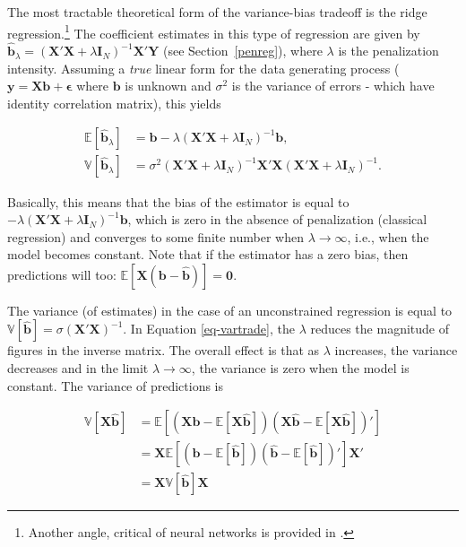 The most tractable theoretical form of the variance-bias tradeoff is the ridge regression.\footnote{Another angle, critical of neural networks is provided in \cite{geman1992neural}.} The coefficient estimates in this type of regression are given by $\hat{\mathbf{b}}_\lambda=(\mathbf{X}'\mathbf{X}+\lambda \mathbf{I}_N)^{ -1}\mathbf{X}'\mathbf{Y}$ (see Section~\ref{penreg}), where $\lambda$ is the penalization intensity. Assuming a \textit{true} linear form for the data generating process ($\textbf{y}=\textbf{Xb}+\boldsymbol{\epsilon}$ where $\textbf{b}$ is unknown and $\sigma^2$ is the variance of errors - which have identity correlation matrix), this yields

\begin{equation}
\label{eq-vartrade}
\begin{aligned}  
\mathbb{E}[\hat{\textbf{b}}_\lambda]&=\textbf{b}-\lambda(\textbf{X}'\textbf{X}+\lambda \textbf{I}_N)^{-1} \textbf{b}, \\
\mathbb{V}[\hat{\textbf{b}}_\lambda]&=\sigma^2(\textbf{X}'\textbf{X}+\lambda \textbf{I}_N)^{-1}\textbf{X}'\textbf{X}   (\textbf{X}'\textbf{X}+\lambda \textbf{I}_N)^{-1}.
\end{aligned}
\end{equation}

Basically, this means that the bias of the estimator is equal to $-\lambda(\textbf{X}'\textbf{X}+\lambda \textbf{I}_N)^{ -1} \textbf{b}$, which is zero in the absence of penalization (classical regression) and converges to some finite number when $\lambda \rightarrow \infty$, i.e., when the model becomes constant. Note that if the estimator has a zero bias, then predictions will too: $\mathbb{E}[\textbf{X}(\textbf{b} -\hat{\textbf{b}})]=\textbf{0}$.

The variance (of estimates) in the case of an unconstrained regression is equal to $\mathbb{V}[\hat{\textbf{b}}]=\sigma (\textbf{X}'\textbf{X})^{ -1}$. In Equation \ref{eq-vartrade}, the $\lambda$ reduces the magnitude of figures in the inverse matrix. The overall effect is that as $\lambda$ increases, the variance decreases and in the limit $\lambda \rightarrow \infty$, the variance is zero when the model is constant. The variance of predictions is

\begin{equation}
\begin{aligned}
\mathbb{V}[\textbf{X}\hat{\textbf{b}}]&=\mathbb{E}[(\textbf{X}\hat{\textbf{b}}-\mathbb{E}[\textbf{X}\hat{\textbf{b}}])(\textbf{X}\hat{\textbf{b}}-\mathbb{E}[\textbf{X}\hat{\textbf{b}}])'] \\
&= \textbf{X}\mathbb{E}[(\hat{\textbf{b}}-\mathbb{E}[\hat{\textbf{b}}])(\hat{\textbf{b}}-\mathbb{E}[\hat{\textbf{b}}])']\textbf{X}' \\
&= \textbf{X}\mathbb{V}[\hat{\textbf{b}}]\textbf{X}
\end{aligned}
\end{equation}

